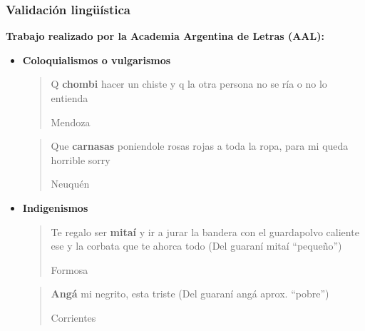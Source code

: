 \begin{frame}[c]\frametitle{Validación lingüística}

  \textbf{Trabajo realizado por la Academia Argentina de Letras (AAL):}
   
  
    \begin{itemize}

      \label{it:caracterizacionLinguistica}
      
      \item \textbf{Coloquialismos o vulgarismos}



      \blockquote[Mendoza]{Q \textbf{chombi} hacer un chiste y q la otra persona no se ría o no lo entienda}
      
      \blockquote[Neuquén]{Que \textbf{carnasas} poniendole rosas rojas a toda la ropa, para mi queda horrible sorry}



     
       \item \textbf{Indigenismos}

      \blockquote[Formosa]{Te regalo ser \textbf{mitaí} y ir a jurar la bandera con el guardapolvo caliente ese y la corbata que te ahorca todo (Del guaraní mitaí “pequeño”)}

      \blockquote[Corrientes]{\textbf{Angá} mi negrito, esta triste (Del guaraní angá aprox. “pobre”)}

     
     

     

\end{itemize}

   
   




\end{frame}

